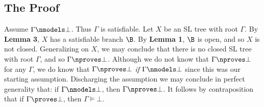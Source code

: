 






\subsection{The Proof}

Assume $\Gamma \nmodels \bot$.
Thus $\Gamma$ is satisfiable. 
Let $X$ be an SL tree with root $\Gamma$.
By \textbf{Lemma 3}, $X$ has a satisfiable branch $\B$.
By \textbf{Lemma 1}, $\B$ is open, and so $X$ is not closed. 
Generalizing on $X$, we may conclude that there is no closed SL tree with root $\Gamma$, and so $\Gamma \nproves \bot$.
Although we do not know that $\Gamma \nproves \bot$ for any $\Gamma$, we do know that $\Gamma \nproves \bot$ \textit{if} $\Gamma \nmodels \bot$ since this was our starting assumption. 
Discharging the assumption we may conclude in perfect generality that: if $\Gamma \nmodels \bot$, then $\Gamma \nproves \bot$.
It follows by contraposition that if $\Gamma \proves \bot$, then $\Gamma \models \bot$.











